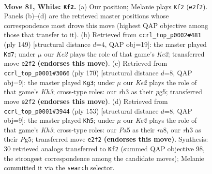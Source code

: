 \documentclass[11pt]{article}
\begin{document}
\clearpage

\begin{figure}[p]\centering
\begin{subfigure}{0.46\textwidth}\centering
\resizebox{\linewidth}{!}{%
\newchessgame
\chessboard[
  setfen={8/1Rn5/3k4/P7/8/7r/4K3/8 w - - 9 81},
  showmover=false,
  pgfstyle=straightmove, color=movearrow, markmove={e2-f2}
]}
\caption{}
\end{subfigure}\hfill
\begin{subfigure}{0.46\textwidth}\centering
\resizebox{\linewidth}{!}{%
\newchessgame
\chessboard[
  setfen={8/4k3/2R5/4p3/6K1/8/1rN5/8 b - - 0 75},
  showmover=false,
  pgfstyle=straightmove, color=movearrow, markmove={e7-d7}
]}
\caption{}
\end{subfigure}
\\[4pt]
\begin{subfigure}{0.46\textwidth}\centering
\resizebox{\linewidth}{!}{%
\newchessgame
\chessboard[
  setfen={8/8/2R2n1P/5kp1/8/7K/8/8 w - - 23 86},
  showmover=false,
  pgfstyle=straightmove, color=movearrow, markmove={h3-g3}
]}
\caption{}
\end{subfigure}\hfill
\begin{subfigure}{0.46\textwidth}\centering
\resizebox{\linewidth}{!}{%
\newchessgame
\chessboard[
  setfen={R7/8/7k/4K1p1/4N3/8/8/4r3 b - - 1 77},
  showmover=false,
  pgfstyle=straightmove, color=movearrow, markmove={h6-h5}
]}
\caption{}
\end{subfigure}
\caption{\textbf{Move 81, White: \texttt{Kf2}.} (a) Our position; Melanie plays \texttt{Kf2} (\texttt{e2f2}). Panels (b)--(d) are the retrieved master positions whose correspondence most drove this move (highest QAP objective among those that transfer to it). (b) Retrieved from \texttt{ccrl\_top\_p0002\#481} (ply 149) [structural distance $d$=4, QAP obj=19]: the master played \texttt{Kd7}; under $\mu$ our \emph{Ke2} plays the role of that game's \emph{Ke2}; transferred move \texttt{e2f2} \textbf{(endorses this move)}. (c) Retrieved from \texttt{ccrl\_top\_p0001\#3066} (ply 170) [structural distance $d$=8, QAP obj=9]: the master played \texttt{Kg3}; under $\mu$ our \emph{Ke2} plays the role of that game's \emph{Kh3}; cross-type roles: our \emph{r}h3 as their \emph{p}g5; transferred move \texttt{e2f2} \textbf{(endorses this move)}. (d) Retrieved from \texttt{ccrl\_top\_p0001\#3944} (ply 153) [structural distance $d$=8, QAP obj=9]: the master played \texttt{Kh5}; under $\mu$ our \emph{Ke2} plays the role of that game's \emph{Kh3}; cross-type roles: our \emph{P}a5 as their \emph{r}a8, our \emph{r}h3 as their \emph{P}g5; transferred move \texttt{e2f2} \textbf{(endorses this move)}. Synthesis: 30 retrieved analogs transferred to \texttt{Kf2} (summed QAP objective 98, the strongest correspondence among the candidate moves); Melanie committed it via the \texttt{search} selector.}
\label{fig:thought-m160}
\end{figure}
\end{document}
